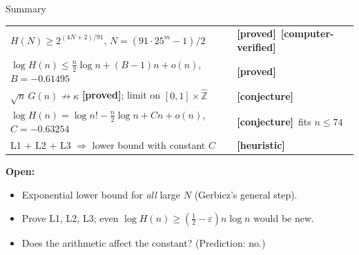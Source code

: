 \documentclass[11pt,aspectratio=169]{beamer}
\newcommand{\Ham}{H}
\newcommand{\Zhat}{\widehat{\mathbb Z}}
\newcommand{\proved}{\textcolor{green!50!black}{\textbf{[proved]}}}
\newcommand{\computed}{\textcolor{blue!70!black}{\textbf{[computer-verified]}}}
\newcommand{\conj}{\textcolor{red!70!black}{\textbf{[conjecture]}}}
\newcommand{\heur}{\textcolor{orange!80!black}{\textbf{[heuristic]}}}
\begin{document}
\begin{frame}{Summary}
\small
\begin{tabular}{@{}ll@{}}
\toprule
$\Ham(N)\ge 2^{(4N+2)/91}$, $N=(91\cdot25^m-1)/2$ & \proved\ \computed\\
$\log\Ham(n)\le\frac n2\log n+(B-1)n+o(n)$, $B=-0.61495$ & \proved\\
$\sqrt n\,G(n)\not\to\kappa$ \proved; limit on $[0,1]\times\Zhat$ & \conj\\
$\log\Ham(n)=\log n!-\frac n2\log n+Cn+o(n)$, $C=-0.63254$ & \conj\ fits $n\le74$\\
L1 $+$ L2 $+$ L3 $\Rightarrow$ lower bound with constant $C$ & \heur\\
\bottomrule
\end{tabular}

\medskip
\textbf{Open:}
\begin{itemize}
\item Exponential lower bound for \emph{all} large $N$ (Gerbicz's general step).
\item Prove L1, L2, L3; even $\log\Ham(n)\ge(\frac12-\varepsilon)n\log n$ would be new.
\item Does the arithmetic affect the constant? (Prediction: no.)
\end{itemize}
\end{frame}
\end{document}
